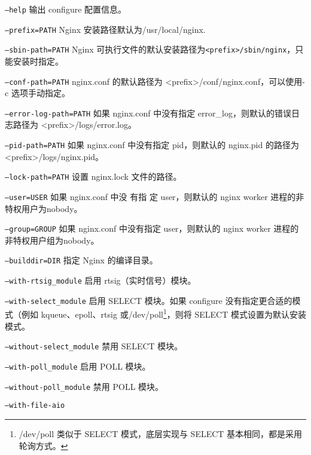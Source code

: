 \begin{lstlisting}[language=bash]

\end{lstlisting}


\begin{compactitem}
\item \texttt{--help}
输出 configure 配置信息。
\item \texttt{--prefix=PATH}
Nginx 安装路径默认为/usr/local/nginx.
\item \texttt{--sbin-path=PATH}
Nginx 可执行文件的默认安装路径为\texttt{<prefix>/sbin/nginx}，只能安装时指定。
\item \texttt{--conf-path=PATH}
nginx.conf 的默认路径为 <prefix>/conf/nginx.conf，可以使用-c 选项手动指定。
\item \texttt{--error-log-path=PATH}
如果 nginx.conf 中没有指定 error\_log，则默认的错误日志路径为 <prefix>/logs/error.log。
\item \texttt{--pid-path=PATH}
如果 nginx.conf 中没有指定 pid，则默认的 nginx.pid 的路径为 <prefix>/logs/nginx.pid。
\item \texttt{--lock-path=PATH}
设置 nginx.lock 文件的路径。
\item \texttt{--user=USER}
如果 nginx.conf 中没 有指 定 user，则默认的 nginx worker 进程的非特权用户为nobody。
\item \texttt{--group=GROUP}
如果 nginx.conf 中没有指定 user，则默认的 nginx worker 进程的非特权用户组为nobody。
\item \texttt{--builddir=DIR}
指定 Nginx 的编译目录。
\item \texttt{--with-rtsig\_module}
启用 rtsig（实时信号）模块。
\item \texttt{--with-select\_module}
启用 SELECT 模块。如果 configure 没有指定更合适的模式（例如 kqueue、epoll、rtsig 或/dev/poll\footnote{/dev/poll 类似于 SELECT 模式，底层实现与 SELECT 基本相同，都是采用轮询方式。}，则将 SELECT 模式设置为默认安装模式。
\item \texttt{--without-select\_module}
禁用 SELECT 模块。
\item \texttt{--with-poll\_module}
启用 POLL 模块。
\item \texttt{--without-poll\_module}
禁用 POLL 模块。
\item \texttt{--with-file-aio}


\end{compactitem}
